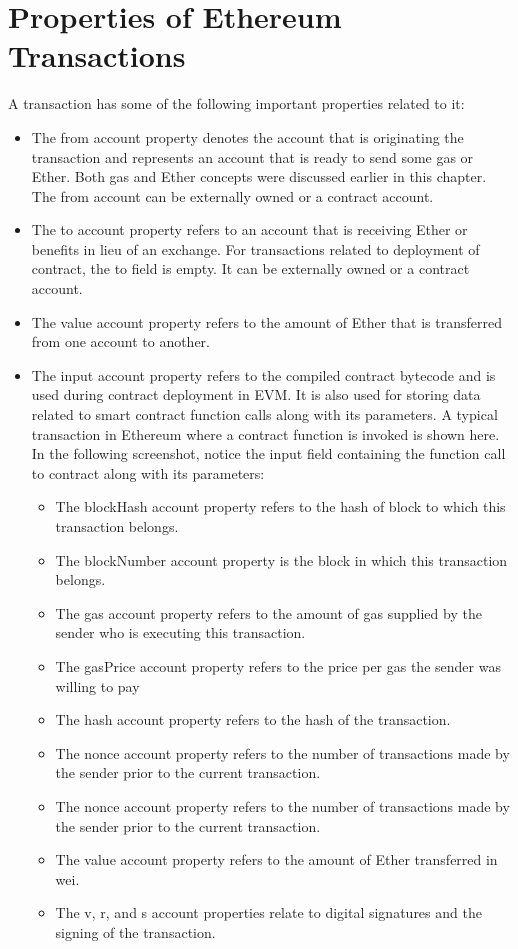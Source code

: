 \section{Properties of Ethereum Transactions}
A transaction has some of the following important properties related to it:

\begin{itemize}
\item The from account property denotes the account that is originating the transaction and represents an account that is ready to send some gas or Ether. Both gas and Ether concepts were discussed earlier in this chapter. The from account can be externally owned or a contract account.
\item The to account property refers to an account that is receiving Ether or benefits in lieu of an exchange. For transactions related to deployment of contract, the to field is empty. It can be externally owned or a contract account.
\item The value account property refers to the amount of Ether that is transferred from one account to another.
\item The input account property refers to the compiled contract bytecode and is used during contract deployment in EVM. It is also used for storing data related to smart contract function calls along with its parameters. A typical transaction in Ethereum where a contract function is invoked is shown here. In the following screenshot, notice the input field containing the function call to contract along with its parameters:
\begin{itemize}
\item The blockHash account property refers to the hash of block to which this transaction belongs.
\item The blockNumber account property is the block in which this transaction belongs.
\item The gas account property refers to the amount of gas supplied by the sender who is executing this transaction.
\item The gasPrice account property refers to the price per gas the sender was willing to pay 
\item The hash account property refers to the hash of the transaction.
\item The nonce account property refers to the number of transactions made by the sender prior to the current transaction.
\item The nonce account property refers to the number of transactions made by the sender prior to the current transaction.
\item The value account property refers to the amount of Ether transferred in wei.
\item The v, r, and s account properties relate to digital signatures and the signing of the transaction.
\end{itemize}
\end{itemize}

